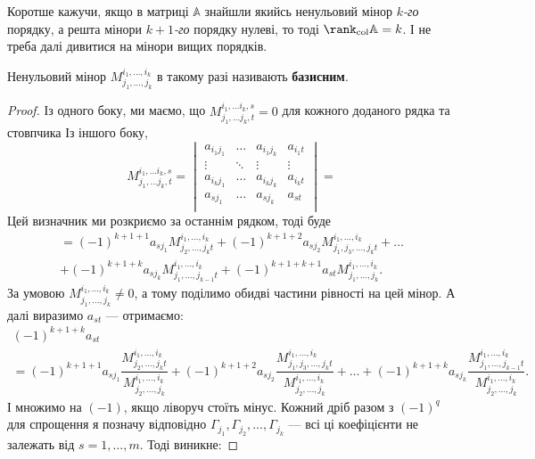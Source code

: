\documentclass{math_library}
\begin{document}
\begin{remark}
Коротше кажучи, якщо в матриці $\mathbb{A}$ знайшли якийсь ненульовий мінор $k$\textit{-го} порядку, а решта мінори $k+1$\textit{-го} порядку нулеві, то тоді $\rank_{\text{col}}\mathbb{A} = k$. І не треба далі дивитися на мінори вищих порядків.
\end{remark}

\begin{remark}
Ненульовий мінор $M_{j_1,\dots,j_k}^{i_1,\dots,i_k}$ в такому разі називають \textbf{базисним}.
\end{remark}

\begin{proof}
Із одного боку, ми маємо, що $M_{j_1,\dots j_k,t}^{i_1, \dots i_k,s} = 0$ для кожного доданого рядка та стовпчика Із іншого боку,
\[
M_{j_1,\dots j_k,t}^{i_1, \dots i_k,s} = \begin{vmatrix}
a_{i_1 j_1} & \dots & a_{i_1 j_k} & a_{i_1 t} \\
\vdots & \ddots & \vdots & \vdots \\
a_{i_k j_1} & \dots & a_{i_k j_k} & a_{i_k t} \\
a_{s j_1} & \dots & a_{s j_k} & a_{s t} \\
\end{vmatrix} \boxed{=}
\]
Цей визначник ми розкриємо за останнім рядком, тоді буде
\begin{multline*}
\boxed{=} (-1)^{k+1+1} a_{sj_1} M_{j_2,\dots,j_k t}^{i_1,\dots,i_k} + (-1)^{k+1+2} a_{sj_2} M_{j_1,j_3,\dots,j_k t}^{i_1,\dots,i_k} + \dots \\ + (-1)^{k+1+k} a_{sj_k}M_{j_1,\dots,j_{k-1} t}^{i_1,\dots,i_k} + (-1)^{k+1+k+1}a_{st} M_{j_1,\dots,j_k}^{i_1,\dots,i_k}.
\end{multline*}
За умовою $M_{j_1,\dots,j_k}^{i_1,\dots,i_k} \neq 0$, а тому поділимо обидві частини рівності на цей мінор. А далі виразимо $a_{st}$ --- отримаємо:
\begin{multline*}
(-1)^{k+1+k}a_{st} \\ = (-1)^{k+1+1} a_{sj_1} \dfrac{M_{j_2,\dots,j_k t}^{i_1,\dots,i_k}}{M_{j_2,\dots,j_k}^{i_1,\dots,i_k}}  + (-1)^{k+1+2} a_{sj_2} \dfrac{M_{j_1,j_3,\dots,j_k t}^{i_1,\dots,i_k}}{M_{j_2,\dots,j_k}^{i_1,\dots,i_k}} + \dots + (-1)^{k+1+k} a_{sj_k} \dfrac{M_{j_1,\dots,j_{k-1} t}^{i_1,\dots,i_k}}{M_{j_2,\dots,j_k}^{i_1,\dots,i_k}}.
\end{multline*}
І множимо на $(-1)$, якщо ліворуч стоїть мінус. Кожний дріб разом з $(-1)^q$ для спрощення я позначу відповідно $\Gamma_{j_1}, \Gamma_{j_2},\dots,\Gamma_{j_k}$ --- всі ці коефіцієнти не залежать від $s = 1,\dots,m$. Тоді виникне:

\end{proof}
\end{document}
